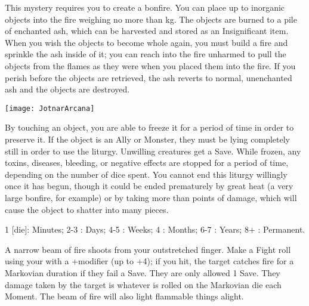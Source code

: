 {\MYSTERY [
  Name = Incinerate,
  Link = arcana-mystery-incinerate,
  Paradigm = Elements,
  Save = N,
  Duration = See Below,
  Target = Close Target(s)
]

This mystery requires you to create a bonfire.  You can place up to \DICE inorganic objects into the fire weighing no more than \SUMDICE kg.  The objects are burned to a pile of enchanted ash, which can be harvested and stored as an Insignificant item.  When you wish the objects to become whole again, you must build a fire and sprinkle the ash inside of it; you can reach into the fire unharmed to pull the objects from the flames as they were when you placed them into the fire.  If you perish before the objects are retrieved, the ash reverts to normal, unenchanted ash and the objects are destroyed.


  \begin{center}
  \texttt{[image: JotnarArcana]}
  \end{center}



\MYSTERY [
  Name = Preserve,
  Link = arcana-mystery-preserve,
  Paradigm = Elements,
  Save = Y (neg.),
  Duration = varies,
  Target = Close Target(s)
]

By touching an object, you are able to freeze it for a period of time in order to preserve it.  If the object is an Ally or Monster, they must be lying completely still in order to use the liturgy.  Unwilling creatures get a Save.  While frozen, any toxins, diseases, bleeding, or negative effects are stopped for a period of time, depending on the number of dice spent.  You cannot end this liturgy willingly once it has begun, though it could be ended prematurely by great heat (a very large bonfire, for example) or by taking more than \SUMDICE points of damage, which will cause the object to shatter into many pieces.  

1 [die]: Minutes; 2-3 \DICE: Days; 4-5 \DICE: Weeks; 4 \DICE: Months; 6-7 \DICE: Years; 8+ \DICE: Permanent. 

\MYSTERY [
  Name = Ray of Fire,
  Link = arcana-mystery-ray-of-fire,
  Paradigm = Elements,
  Save = Y (neg.),
  Duration = Instant,
  Target = Nearby or Far-Away Target(s)
]

A narrow beam of fire shoots from your outstretched finger.  Make a Fight roll using your \FOC with a +\DICE modifier (up to +4); if you hit, the target catches fire for a Markovian duration if they fail a Save.  They are only allowed 1 Save.  They damage taken by the target is whatever is rolled on the Markovian die each Moment.  The beam of fire will also light flammable things alight.

}
